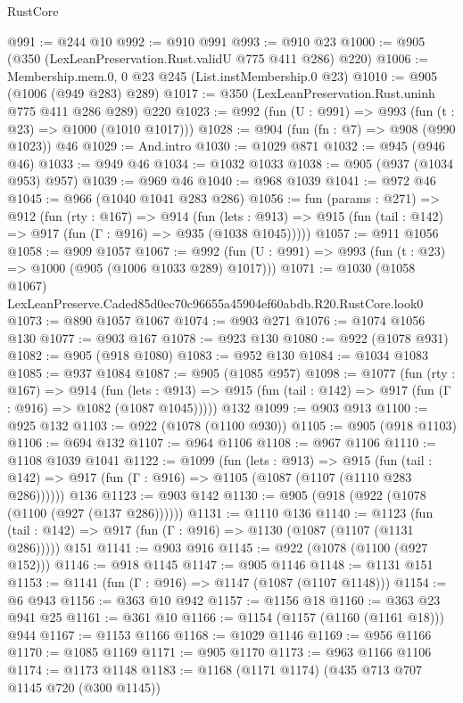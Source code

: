 \begin{lexlean}{RustCore}
\begin{coremodule}
@991 := @244 @10
@992 := @910 @991
@993 := @910 @23
@1000 := @905 (@350 (LexLeanPreservation.Rust.validU @775 @411 @286) @220)
@1006 := Membership.mem.{0, 0} @23 @245 (List.instMembership.{0} @23)
@1010 := @905 (@1006 (@949 @283) @289)
@1017 := @350 (LexLeanPreservation.Rust.uninh @775 @411 @286 @289) @220
@1023 := @992 (fun (U : @991) => @993 (fun (t : @23) => @1000 (@1010 @1017)))
@1028 := @904 (fun (fn : @7) => @908 (@990 @1023)) @46
@1029 := And.intro
@1030 := @1029 @871
@1032 := @945 (@946 @46)
@1033 := @949 @46
@1034 := @1032 @1033
@1038 := @905 (@937 (@1034 @953) @957)
@1039 := @969 @46
@1040 := @968 @1039
@1041 := @972 @46
@1045 := @966 (@1040 @1041 @283 @286)
@1056 := fun (params : @271) =>
  @912
    (fun (rty : @167) =>
    @914
      (fun (lets : @913) =>
      @915 (fun (tail : @142) => @917 (fun (Γ : @916) => @935 (@1038 @1045)))))
@1057 := @911 @1056
@1058 := @909 @1057
@1067 := @992 (fun (U : @991) => @993 (fun (t : @23) => @1000 (@905 (@1006 @1033 @289) @1017)))
@1071 := @1030 (@1058 @1067) LexLeanPreserve.Caded85d0ec70c96655a45904ef60abdb.R20.RustCore.look0
@1073 := @890 @1057 @1067
@1074 := @903 @271
@1076 := @1074 @1056 @130
@1077 := @903 @167
@1078 := @923 @130
@1080 := @922 (@1078 @931)
@1082 := @905 (@918 @1080)
@1083 := @952 @130
@1084 := @1034 @1083
@1085 := @937 @1084
@1087 := @905 (@1085 @957)
@1098 := @1077
    (fun (rty : @167) =>
    @914
      (fun (lets : @913) =>
      @915 (fun (tail : @142) => @917 (fun (Γ : @916) => @1082 (@1087 @1045)))))
    @132
@1099 := @903 @913
@1100 := @925 @132
@1103 := @922 (@1078 (@1100 @930))
@1105 := @905 (@918 @1103)
@1106 := @694 @132
@1107 := @964 @1106
@1108 := @967 @1106
@1110 := @1108 @1039 @1041
@1122 := @1099
    (fun (lets : @913) =>
    @915 (fun (tail : @142) => @917 (fun (Γ : @916) => @1105 (@1087 (@1107 (@1110 @283 @286))))))
    @136
@1123 := @903 @142
@1130 := @905 (@918 (@922 (@1078 (@1100 (@927 (@137 @286))))))
@1131 := @1110 @136
@1140 := @1123
    (fun (tail : @142) => @917 (fun (Γ : @916) => @1130 (@1087 (@1107 (@1131 @286)))))
    @151
@1141 := @903 @916
@1145 := @922 (@1078 (@1100 (@927 @152)))
@1146 := @918 @1145
@1147 := @905 @1146
@1148 := @1131 @151
@1153 := @1141 (fun (Γ : @916) => @1147 (@1087 (@1107 @1148)))
@1154 := @6 @943
@1156 := @363 @10 @942
@1157 := @1156 @18
@1160 := @363 @23 @941 @25
@1161 := @361 @10
@1166 := @1154 (@1157 (@1160 (@1161 @18))) @944
@1167 := @1153 @1166
@1168 := @1029 @1146
@1169 := @956 @1166
@1170 := @1085 @1169
@1171 := @905 @1170
@1173 := @963 @1166 @1106
@1174 := @1173 @1148
@1183 := @1168 (@1171 @1174) (@435 @713 @707 @1145 @720 (@300 @1145))

\end{coremodule}
\end{lexlean}
